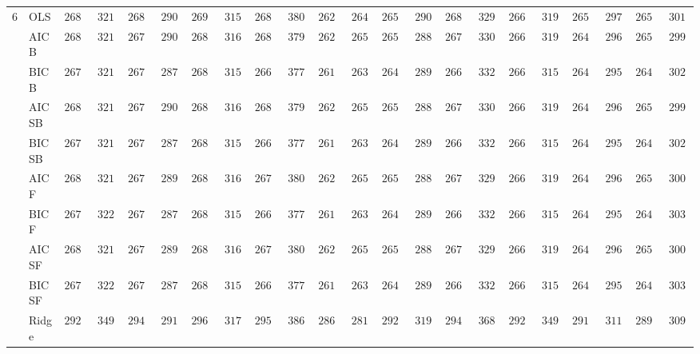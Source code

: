 \begin{tabular}{ll|ll|llllll|llllll|llllll}
6 & OLS  & $2685.11$ & $321.65$ & $2681.03$ & $290.53$ & $2693.97$ & $315.60$ & $2688.88$ & $380.44$ & $2627.28$ & $264.68$ & $2657.71$ & $290.75$ & $2681.07$ & $329.88$ & $2669.62$ & $319.31$ & $2653.24$ & $297.06$ & $2655.97$ & $301.03$ \\
 & AIC B  & $2680.84$ & $321.36$ & $2676.94$ & $290.66$ & $2689.45$ & $316.70$ & $2680.40$ & $379.80$ & $2623.09$ & $265.06$ & $2652.12$ & $288.61$ & $2674.36$ & $330.21$ & $2668.99$ & $319.28$ & $2649.50$ & $296.26$ & $2651.86$ & $299.83$ \\
 & BIC B  & $2673.93$ & $321.96$ & $2672.07$ & $287.70$ & $2683.69$ & $315.27$ & $2669.74$ & $377.79$ & $2614.05$ & $263.04$ & $2644.55$ & $289.57$ & $2668.42$ & $332.51$ & $2662.65$ & $315.24$ & $2640.90$ & $295.29$ & $2646.33$ & $302.84$ \\
 & AIC SB  & $2680.84$ & $321.36$ & $2676.94$ & $290.66$ & $2689.45$ & $316.70$ & $2680.40$ & $379.80$ & $2623.09$ & $265.06$ & $2652.12$ & $288.61$ & $2674.36$ & $330.21$ & $2668.99$ & $319.28$ & $2649.50$ & $296.26$ & $2651.86$ & $299.83$ \\
 & BIC SB  & $2673.93$ & $321.96$ & $2672.07$ & $287.70$ & $2683.69$ & $315.27$ & $2669.74$ & $377.79$ & $2614.05$ & $263.04$ & $2644.55$ & $289.57$ & $2668.42$ & $332.51$ & $2662.65$ & $315.24$ & $2640.90$ & $295.29$ & $2646.33$ & $302.84$ \\
 & AIC F  & $2680.75$ & $321.34$ & $2676.10$ & $289.96$ & $2688.15$ & $316.80$ & $2677.23$ & $380.46$ & $2623.04$ & $265.04$ & $2651.29$ & $288.27$ & $2671.46$ & $329.52$ & $2668.55$ & $319.03$ & $2648.43$ & $296.54$ & $2650.86$ & $300.73$ \\
 & BIC F  & $2673.34$ & $322.12$ & $2672.07$ & $287.70$ & $2683.29$ & $315.45$ & $2669.74$ & $377.79$ & $2613.70$ & $263.20$ & $2644.30$ & $289.69$ & $2667.58$ & $332.92$ & $2662.65$ & $315.24$ & $2640.48$ & $295.07$ & $2646.63$ & $303.15$ \\
 & AIC SF  & $2680.75$ & $321.34$ & $2676.10$ & $289.96$ & $2688.15$ & $316.80$ & $2677.23$ & $380.46$ & $2623.04$ & $265.04$ & $2651.29$ & $288.27$ & $2671.47$ & $329.52$ & $2668.55$ & $319.03$ & $2648.43$ & $296.54$ & $2650.86$ & $300.73$ \\
 & BIC SF  & $2673.34$ & $322.12$ & $2672.07$ & $287.70$ & $2683.29$ & $315.45$ & $2669.74$ & $377.79$ & $2613.70$ & $263.20$ & $2644.30$ & $289.69$ & $2667.62$ & $332.91$ & $2662.65$ & $315.24$ & $2640.48$ & $295.07$ & $2646.63$ & $303.15$ \\
 & Ridge  & $2929.29$ & $349.67$ & $2942.89$ & $291.69$ & $2967.01$ & $317.15$ & $2952.16$ & $386.78$ & $2864.22$ & $281.97$ & $2929.88$ & $319.63$ & $2945.32$ & $368.81$ & $2920.99$ & $349.24$ & $2913.64$ & $311.21$ & $2891.17$ & $309.37$ \\

\end{tabular}

